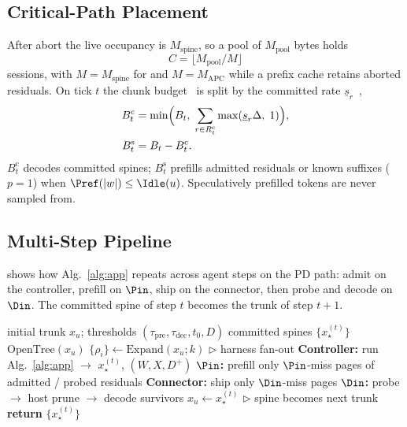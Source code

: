 \subsection{Critical-Path Placement}
\label{sec:schedule}
After abort the live occupancy is $M_{\mathrm{spine}}$, so a pool of $M_{\mathrm{pool}}$ bytes holds
\begin{equation}
\label{eq:slots}
C=\bigl\lfloor M_{\mathrm{pool}}/M\bigr\rfloor
\end{equation}
sessions, with $M{=}M_{\mathrm{spine}}$ for \sys and $M{=}M_{\mathrm{APC}}$ while a prefix cache retains aborted residuals.
On tick $t$ the chunk budget~\cite{sarathi} is split by the committed rate $\underline{s}_r$~\cite{jitserve},
\begin{align}
B^{\mathrm{c}}_t &= \min\Bigl(B_t,\; \sum_{r\in R^{\mathrm{c}}_t}\max(\underline{s}_r\Delta,\;1)\Bigr), \label{eq:bc}\\
B^{\mathrm{s}}_t &= B_t-B^{\mathrm{c}}_t. \label{eq:bs}
\end{align}
$B^{\mathrm{c}}_t$ decodes committed spines; $B^{\mathrm{s}}_t$ prefills admitted residuals or known suffixes ($p{=}1$) when $\Pref(|w|)\le\Idle(u)$.
Speculatively prefilled tokens are never sampled from.

\subsection{Multi-Step Pipeline}
\label{sec:pipeline}
 shows how Alg.~\ref{alg:app} repeats across agent steps on the PD path: admit on the controller, prefill on $\Pin$, ship on the connector, then probe and decode on $\Din$.
The committed spine of step $t$ becomes the trunk of step $t{+}1$.

\begin{algorithm}[t]
\caption{\sys{} multi-step pipeline.
Each step invokes Alg.~\ref{alg:app}.}
\label{alg:pipeline}
\small
\begin{algorithmic}[1]
\REQUIRE initial trunk $x_u$; thresholds $(\tau_{\mathrm{pre}},\tau_{\mathrm{dec}},t_0,D)$
\ENSURE committed spines $\{x_\star^{(t)}\}$
\STATE $\mathrm{OpenTree}(x_u)$
  \STATE $\{\rho_i\}\leftarrow\mathrm{Expand}(x_u;k)$ \hfill \(\triangleright\) harness fan-out
  \STATE \textbf{Controller:} run Alg.~\ref{alg:app} $\to$ $x_\star^{(t)}$, $(W,X,D^{+})$
  \STATE \textbf{$\Pin$:} prefill only $\Pin$-miss pages of admitted / probed residuals
  \STATE \textbf{Connector:} ship only $\Din$-miss pages
  \STATE \textbf{$\Din$:} probe $\to$ host prune $\to$ decode survivors
  \STATE $x_u\leftarrow x_\star^{(t)}$ \hfill \(\triangleright\) spine becomes next trunk
\ENDFOR
\STATE \textbf{return} $\{x_\star^{(t)}\}$
\end{algorithmic}
\end{algorithm}

